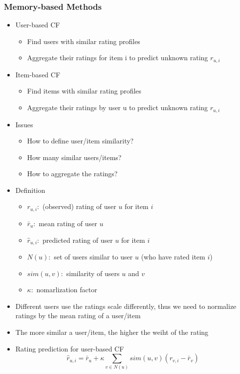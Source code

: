 \documentclass[../notes.tex]{subfiles}
\begin{document}
\subsubsection{Memory-based Methods}
\begin{itemize}
  \item User-based CF
  \begin{itemize}
    \item Find users with similar rating profiles
    \item Aggregate their ratings for item i to predict unknown rating $r_{u,i}$
  \end{itemize}

  \item Item-based CF
  \begin{itemize}
    \item Find items with similar rating profiles
    \item Aggregate their ratings by user u to predict unknown rating  $r_{u,i}$
  \end{itemize}

  \item Issues
  \begin{itemize}
    \item How to define user/item similarity?
    \item How many similar users/items?
    \item How to aggregate the ratings?
  \end{itemize}

  \item Definition
  \begin{itemize}
    \item $r_{u,i}:$ (observed) rating of user $u$ for item $i$
    \item $\bar r_u:$ mean rating of user $u$
    \item $\hat r_{u,i}:$ predicted rating of user $u$ for item $i$
    \item $N(u):$ set of users similar to user $u$ (who have rated item $i$)
    \item $sim(u,v):$ similarity of users $u$ and $v$
    \item $\kappa:$ nomarlization factor
  \end{itemize}

  \item Different users use the ratings scale differently, thus we need to normalize ratings by the mean rating of a user/item
  \item The more similar a user/item, the higher the weiht of the rating
  \item Rating prediction for user-based CF $$\hat r_{u,i} = \bar r_{u} + \kappa \sum_{v \in N(u)}sim(u,v)(r_{v,i} - \bar r_v)$$


\end{itemize}
\end{document}
